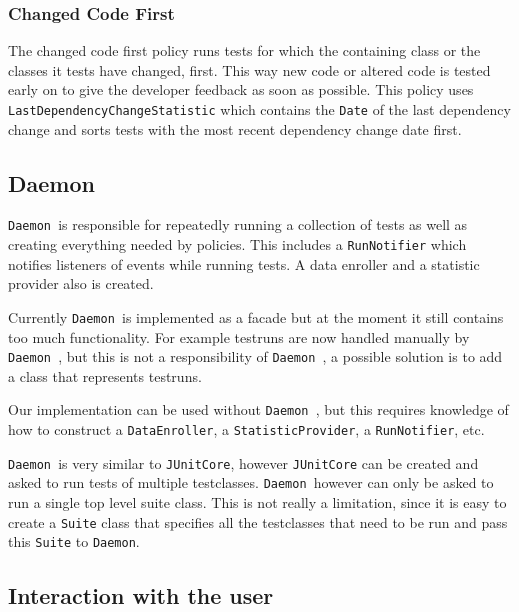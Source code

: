 \documentclass[i2]{oss}
\newcommand{\class}[1]{\texttt{#1}}
\newcommand{\Daemon}{\class{Daemon  }}
\begin{document}
\subsubsection{Changed Code First}

The changed code first policy runs tests for which the containing class 
or the classes it tests have changed, first.
This way new code or altered code is tested early on to give the 
developer feedback as soon as possible.
This policy uses \class{LastDependencyChangeStatistic} which contains the
\class{Date} of the last dependency change and sorts tests with the most 
recent dependency change date first.




\subsection{Daemon}
\label{subssec: daemon}

\Daemon is responsible for repeatedly running a collection of tests as well as creating everything needed by policies.
This includes a \class{RunNotifier} which notifies listeners of events while running tests. A data enroller and a statistic provider also is created.

Currently \Daemon is implemented as a facade but at the moment it still
contains too much functionality.
For example testruns are now handled manually by \Daemon, but this is
not a responsibility of \Daemon, a possible solution is to add a class
that represents testruns.

Our implementation can be used without \Daemon, but this requires
knowledge of how to construct a \class{DataEnroller},
a \class{StatisticProvider}, a \class{RunNotifier}, etc.

\Daemon is very similar to \class{JUnitCore}, however \class{JUnitCore}
can be created and asked to run tests of multiple testclasses.
\Daemon however can only be asked to run a single top level suite class. This is not really a limitation, since it is easy to create a \class{Suite} class that specifies all the testclasses that need to be run and pass this \class{Suite} to \class{Daemon}.









\subsection{Interaction with the user}
\end{document}
